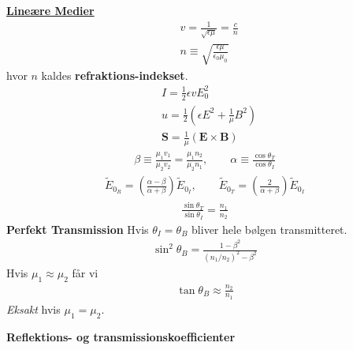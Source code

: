 \documentclass[a4paper]{article}
\begin{document}
    \underline{\textbf{Lineære Medier}}
    \begin{align*}
        &\boxed{v = \frac{1}{\sqrt{\epsilon \mu } } = \frac{c}{n}}\tag{9.69}\\
        &n \equiv \sqrt{\frac{\epsilon \mu }{\epsilon _0 \mu _0}} \tag{9.70}
    \end{align*}
    hvor \(n\) kaldes \textbf{refraktions-indekset}.\begin{align*}
        &I = \frac{1}{2} \epsilon v E_0 ^2\tag{9.74}\\
        &u = \frac{1}{2} \left( \epsilon E^{2} + \frac{1}{\mu } B^{2}  \right) \tag{9.72}\\
        &\mathbf{S} = \frac{1}{\mu } \left( \mathbf{E} \times \mathbf{B} \right) \tag{9.73}
    \end{align*}
    \begin{align*}
        \beta \equiv \frac{\mu _1 v_1}{\mu _2 v_2} = \frac{\mu _1 n_2}{\mu _2 n_1}, \qquad \alpha \equiv \frac{\cos \theta_T}{\cos \theta  _I}
    \end{align*}
    \begin{align*}
        \boxed{\tilde{E}_{0_R} = \left( \frac{\alpha - \beta }{\alpha + \beta }\right) \tilde{E}_{0_I}, \qquad \tilde{E}_{0_T} = \left( \frac{2}{\alpha + \beta }\right) \tilde{E}_{0_I}} \tag{9.110}
    \end{align*}
    \begin{align*}
        \boxed{\frac{\sin \theta _T}{\sin \theta _I} = \frac{n_1}{n_2}} \tag{9.101}
    \end{align*}
    \textbf{Perfekt Transmission}
    Hvis \(\theta _I = \theta _B\) bliver hele bølgen transmitteret.
    \begin{align*}
        \sin ^2 \theta _B = \frac{1 - \beta ^{2} }{(n_1 / n_2)^{2} - \beta ^2} \tag{9.112}
    \end{align*}
    Hvis \(\mu _1 \approx \mu _2\) får vi \begin{align*}
        \tan \theta _B \approx \frac{n_2}{n_1} \tag{9.113}
    \end{align*} 
    \textit{Eksakt} hvis \(\mu _1 = \mu _2\). 

    \textbf{Reflektions- og transmissionskoefficienter} 
\end{document}
